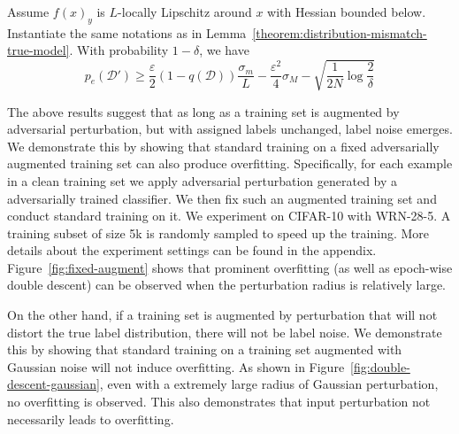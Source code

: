    \begin{theorem}
    \label{theo:main}
    Assume $f(x)_y$ is $L$-locally Lipschitz around $x$ with Hessian bounded below. 
    Instantiate the same notations as in Lemma~\ref{theorem:distribution-mismatch-true-model}. With probability $1 - \delta$, we have
    \begin{equation}
    \label{theo:label-noise-dependence}
        p_e(\mathcal{D}') \ge \frac{\varepsilon}{2} (1 - q(\mathcal{D})) \frac{\sigma_m}{L}  - \frac{\varepsilon^2}{4} \sigma_M -\sqrt{\frac{1}{2N}\log\frac{2}{\delta}}
    \end{equation}
    \end{theorem}

    
    
    The above results suggest that as long as a training set is augmented by adversarial perturbation, but with assigned labels unchanged, label noise emerges. We demonstrate this by showing that standard training on a fixed adversarially augmented training set can also produce overfitting. Specifically, for each example in a clean training set we apply adversarial perturbation generated by a adversarially trained classifier. We then fix such an augmented training set and conduct standard training on it. We experiment on CIFAR-10 with WRN-28-5. A training subset of size 5k is randomly sampled to speed up the training. More details about the experiment settings can be found in the appendix. Figure~\ref{fig:fixed-augment} shows that prominent overfitting (as well as epoch-wise double descent) can be observed when the perturbation radius is relatively large.
    
    On the other hand, if a training set is augmented by perturbation that will not distort the true label distribution, there will not be label noise. We demonstrate this by showing that standard training on a training set augmented with Gaussian noise will not induce overfitting. As shown in Figure~\ref{fig:double-descent-gaussian}, even with a extremely large radius of Gaussian perturbation, no overfitting is observed. This also demonstrates that input perturbation not necessarily leads to overfitting.
    

